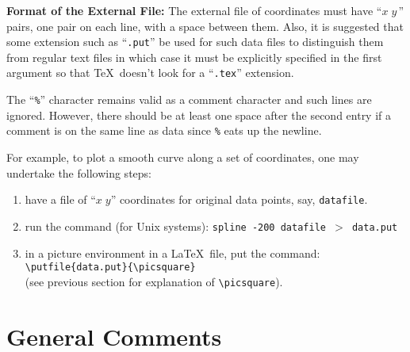 {\bf Format of the External File:} The external file of coordinates must have
``$x\;y\,$'' pairs, one pair on each line, with a space between them. Also, it
is suggested that some extension such as ``{\tt .put}'' be used for such
data files to distinguish them from regular text files in which case it must
be explicitly specified in the first argument so that \TeX\ doesn't look for
a ``{\tt .tex}'' extension.

The ``{\tt \%}'' character remains valid as a comment character and such lines
are ignored. However, there should be at least one space after the second
entry if a comment is on the same line as data since {\tt \%} eats up the
newline.

For example, to plot a smooth curve along a set of coordinates, one may
undertake the following steps:
\begin{enumerate}
\item have a file of ``$x\;y$'' coordinates for original data points, say,
{\tt datafile}.
\item run the command (for Unix systems): {\tt spline -200 datafile $>$
data.put}
\item in a picture environment in a \LaTeX\ file, put the command:\\
\hspace*{20pt}\verb|\putfile{data.put}{\picsquare}|\\
(see previous section for explanation of \verb|\picsquare|).
\end{enumerate}

\section{General Comments}

